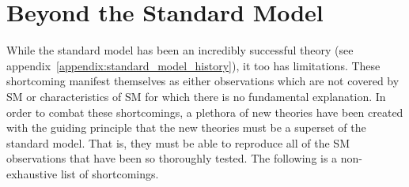 \section{Beyond the Standard Model}
\label{sec:BSM}

While the standard model has been an incredibly successful theory (see appendix~\ref{appendix:standard_model_history}), it too has limitations.
These shortcoming manifest themselves as either observations which are not covered by SM or characteristics of SM for which there is no fundamental explanation.
In order to combat these shortcomings, a plethora of new theories have been created with the guiding principle that the new theories must be a superset of the standard model.
That is, they must be able to reproduce all of the SM observations that have been so thoroughly tested.
The following is a non-exhaustive list of shortcomings.
